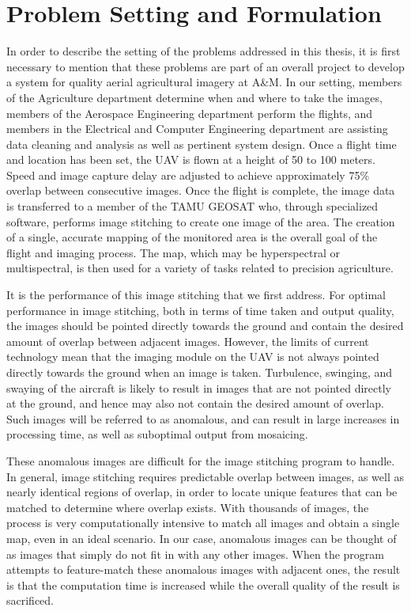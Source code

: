 \section{Problem Setting and Formulation}

In order to describe the setting of the problems addressed in this thesis, it is first necessary to mention that these problems are part of an overall project to develop a system for quality aerial agricultural imagery at A\&M.
In our setting, members of the Agriculture department determine when and where to take the images, members of the Aerospace Engineering department perform the flights, and members in the Electrical and Computer Engineering department are assisting data cleaning and analysis as well as pertinent system design.
Once a flight time and location has been set, the UAV is flown at a height of 50 to 100 meters.
Speed and image capture delay are adjusted to achieve approximately 75\% overlap between consecutive images.
Once the flight is complete, the image data is transferred to a member of the TAMU GEOSAT who, through specialized software, performs image stitching to create one image of the area.
The creation of a single, accurate mapping of the monitored area is the overall goal of the flight and imaging process.
The map, which may be hyperspectral or multispectral, is then used for a variety of tasks related to precision agriculture.

It is the performance of this image stitching that we first address.
For optimal performance in image stitching, both in terms of time taken and output quality, the images should be pointed directly towards the ground and contain the desired amount of overlap between adjacent images.
However, the limits of current technology mean that the imaging module on the UAV is not always pointed directly towards the ground when an image is taken.
Turbulence, swinging, and swaying of the aircraft is likely to result in images that are not pointed directly at the ground, and hence may also not contain the desired amount of overlap.
Such images will be referred to as anomalous, and can result in large increases in processing time, as well as suboptimal output from mosaicing.

These anomalous images are difficult for the image stitching program to handle.
In general, image stitching requires predictable overlap between images, as well as nearly identical regions of overlap, in order to locate unique features that can be matched to determine where overlap exists.
With thousands of images, the process is very computationally intensive to match all images and obtain a single map, even in an ideal scenario.
In our case, anomalous images can be thought of as images that simply do not fit in with any other images.
When the program attempts to feature-match these anomalous images with adjacent ones, the result is that the computation time is increased while the overall quality of the result is sacrificed.

